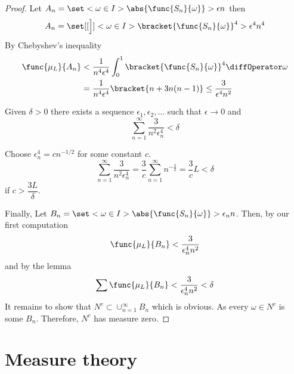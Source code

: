 \begin{proof}
    Let \(A_n = \set<\omega \in I>{\abs{\func{S_n}{\omega}} > \epsilon n}\) then 
    \begin{equation*}
        A_n = \set[[\Big]]<\omega \in I>{\bracket{\func{S_n}{\omega}}^4 > \epsilon^4 n^4}
    \end{equation*}
    By Chebyshev's inequality
    \begin{align*}
        \func{\mu_L}{A_n} &< \dfrac{1}{n^4 \epsilon^4} \int_0^1 \bracket{\func{S_n}{\omega}}^4 \diffOperator \omega \\
        &= \dfrac{1}{n^4 \epsilon^4} \bracket{n + 3n(n-1)} \leq \dfrac{3}{\epsilon^4 n^2}
    \end{align*}
    \begin{lemma}
        Given \(\delta > 0\) there exists a sequence \(\epsilon_1, \epsilon_2, \dots \) such that \(\epsilon \to 0\) and 
        \begin{equation*}
            \sum_{n = 1}^{\infty} \dfrac{3}{n^2 \epsilon_n^4} < \delta
        \end{equation*}
    \end{lemma}
    \begin{prooflemma}
        Choose \(\epsilon_n^4 = cn^{-1/2}\) for some constant \(c\). 
        \begin{equation*}
            \sum_{n = 1}^{\infty} \dfrac{3}{n^2 \epsilon_n^4} =\dfrac{3}{c} \sum_{n = 1}^{\infty} n^{-\frac{3}{2}} = \dfrac{3}{c}L < \delta
        \end{equation*}
        if \(c > \dfrac{3L}{\delta}\).
    \end{prooflemma}
    Finally, Let \(B_n = \set<\omega \in I> {\abs{\func{S_n}{\omega}} > \epsilon_n n}\). Then, by our first computation 
    \begin{equation*}
        \func{\mu_L}{B_n} < \dfrac{3}{\epsilon_n^4 n^2}
    \end{equation*}
    and by the lemma 
    \begin{equation*}
        \sum  \func{\mu_L}{B_n} < \dfrac{3}{\epsilon_n^4 n^2} < \delta 
    \end{equation*}
    It remains to show that \(N^c \subset \cup_{n = 1}^{\infty} B_n\) which is obvious. As every \(\omega \in N^c\) is some \(B_n\). Therefore, \(N^c\) has measure zero.
\end{proof}
\section{Measure theory}
